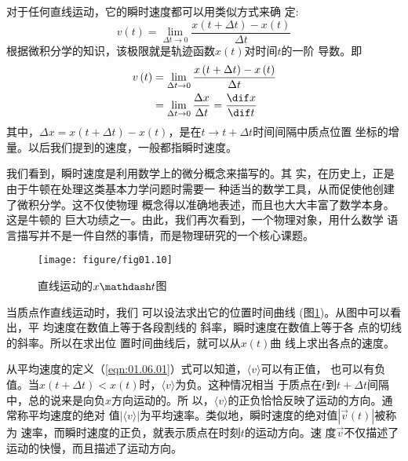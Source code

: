 \documentclass[../outline-of-mechanics.tex]{subfiles}
\begin{document}
对于任何直线运动，它的瞬时速度都可以用类似方式来确
定:
\begin{equation*}
  v\left(t\right)=\lim _{\Delta t \rightarrow 0} \frac{x\left(t+\Delta t\right)-x\left(t\right)}{\Delta t}
\end{equation*}
根据微积分学的知识，该极限就是轨迹函数$x\left(t\right)$对时间$t$的一阶
导数。即
\begin{equation}
  \begin{aligned}
    v\left(t\right) & =\lim _{\Delta t \rightarrow 0} \frac{x\left(t+\Delta t\right)-x\left(t\right)}{\Delta t}            \\
                    & =\lim _{\Delta t \rightarrow 0} \frac{\Delta x}{\Delta t}=\frac{\dif x}{\dif t} \label{eqn:01.06.03}
  \end{aligned}
\end{equation}
其中，$\Delta x=x\left(t+\Delta t\right)-x\left(t\right)$，是在$t\rightarrow t+\Delta t$时间间隔中质点位置
坐标的增量。以后我们提到的速度，一般都指瞬时速度。

我们看到，瞬时速度是利用数学上的微分概念来描写的。其
实，在历史上，正是由于牛顿在处理这类基本力学问题时需要一
种适当的数学工具，从而促使他创建了微积分学。这不仅使物理
概念得以准确地表述，而且也大大丰富了数学本身。这是牛顿的
巨大功绩之一。由此，我们再次看到，一个物理对象，用什么数学
语言描写并不是一件自然的事情，而是物理研究的一个核心课题。

\begin{wrapfigure}[10]{r}{13em}
  \centering
  \texttt{[image: figure/fig01.10]}
  \caption{直线运动的$x \mathdash t$图}
  \label{fig:01.10}
\end{wrapfigure}
当质点作直线运动时，我们
可以设法求出它的位置时间曲线
(图\ref{fig:01.10})。从图中可以看出，平
均速度在数值上等于各段割线的
斜率，瞬时速度在数值上等于各
点的切线的斜率。所以在求出位
置时间曲线后，就可以从$x\left(t\right)$曲
线上求出各点的速度。

从平均速度的定义（\ref{eqn:01.06.01}）式可以知道，$\langle v\rangle$可以有正值，
也可以有负值。当$x\left(t+\Delta t\right)<x\left(t\right)$时，$\langle v\rangle$为负。这种情况相当
于质点在$t$到$t+\Delta t$间隔中，总的说来是向负$x$方向运动的。所
以，$\langle v\rangle$的正负恰恰反映了运动的方向。通常称平均速度的绝对
值$|\langle v\rangle|$为平均速率。类似地，瞬时速度的绝对值$|\vec{v}\left(t\right)|$被称为
速率，而瞬时速度的正负，就表示质点在时刻$t$的运动方向。速
度$\vec{v}$不仅描述了运动的快慢，而且描述了运动方向。
\end{document}
